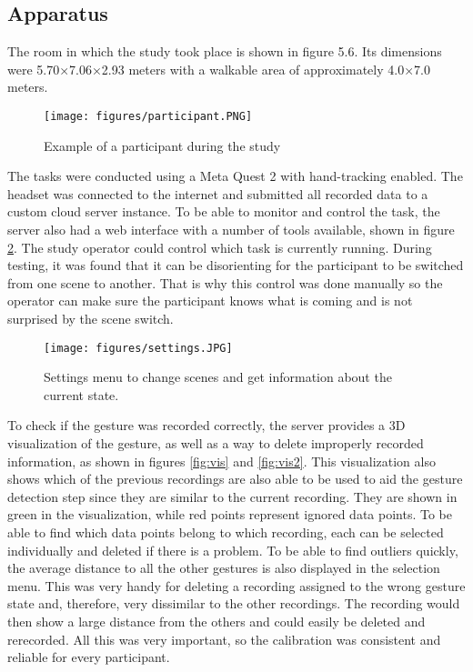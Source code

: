 



\subsection{Apparatus}

The room in which the study took place is shown in figure 5.6. Its dimensions were 5.70×7.06×2.93 meters with a walkable area of approximately 4.0×7.0 meters.

\begin{figure}[!ht]
    \centering
    \texttt{[image: figures/participant.PNG]}
    \caption{Example of a participant during the study}
    \label{fig:video}
\end{figure}

The tasks were conducted using a Meta Quest 2 with hand-tracking enabled. The headset was connected to the internet and submitted all recorded data to a custom cloud server instance. To be able to monitor and control the task, the server also had a web interface with a number of tools available, shown in figure \ref{fig:settings}. The study operator could control which task is currently running. During testing, it was found that it can be disorienting for the participant to be switched from one scene to another. That is why this control was done manually so the operator can make sure the participant knows what is coming and is not surprised by the scene switch.

\begin{figure}[!ht]
    \centering
    \texttt{[image: figures/settings.JPG]}
    \caption{Settings menu to change scenes and get information about the current state.}
    \label{fig:settings}
\end{figure}

To check if the gesture was recorded correctly, the server provides a 3D visualization of the gesture, as well as a way to delete improperly recorded information, as shown in figures \ref{fig:vis} and  \ref{fig:vis2}. This visualization also shows which of the previous recordings are also able to be used to aid the gesture detection step since they are similar to the current recording. They are shown in green in the visualization, while red points represent ignored data points. To be able to find which data points belong to which recording, each can be selected individually and deleted if there is a problem. To be able to find outliers quickly, the average distance to all the other gestures is also displayed in the selection menu. This was very handy for deleting a recording assigned to the wrong gesture state and, therefore, very dissimilar to the other recordings. The recording would then show a large distance from the others and could easily be deleted and rerecorded. All this was very important, so the calibration was consistent and reliable for every participant.

